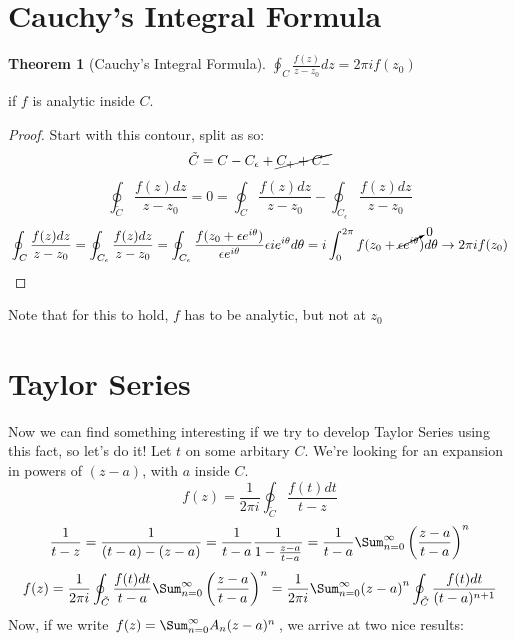 \documentclass[11pt,notitlepage]{article}
\newtheorem{thm}{Theorem}[section]
\begin{document}
\section{Cauchy's Integral Formula}
\begin{thm}[Cauchy's Integral Formula]
$\oint_C \frac{f(z)}{z-z_0} dz = 2\pi i f(z_0)$ 
\end{thm}
\begin{flushright}
if $f$ is analytic inside $C$.
\end{flushright}
\begin{proof}

Start with this contour, split as so:
$$\tilde C = C - C_\epsilon +\cancel{C_{+} + C_{-}}$$
$$\oint_{\tilde C} \frac{f(z) dz}{z-z_0} 
= 0 
=\oint_{ C} \frac{f(z) dz}{z-z_0} -\oint_{C_\epsilon} \frac{f(z) dz}{z-z_0}$$
$$\oint_{C} \frac{f(z) dz}{z-z_0} 
= \oint_{C_\epsilon} \frac{f(z) dz}{z-z_0}
= \oint_{C_\epsilon} \frac{f(z_0 + \epsilon e^{i\theta}) }{\epsilon e^{i\theta}} \epsilon i e^{i\theta} d\theta 
= i \int_0^{2\pi} f(z_0 + \cancelto{0}{\epsilon e^{i\theta}}) d\theta \rightarrow 2\pi i f(z_0) $$
\end{proof}
Note that for this to hold, $f$ has to be analytic, but not at $z_0$
\section{Taylor Series}
Now we can find something interesting if we try to develop Taylor Series using this fact, so let's do it! Let $t$ on some arbitary $C$. We're looking for an expansion in powers of $(z-a)$, with $a$ inside $C$. 
$$ f(z) = \frac1{2\pi i}\oint_{\tilde C} \frac{f(t) dt}{t-z} $$
$$\frac1{t-z} = \frac1{(t-a)-(z-a)} = \frac1{t-a}\frac1{1-{\frac{z-a}{t-a}}} = \frac1{t-a}\Sum_{n=0}^\infty\left(\frac{z-a}{t-a}\right)^n$$
$$ f(z) = \frac1{2\pi i}\oint_{\tilde C} \frac{f(t) dt}{t-a} \Sum_{n=0}^\infty\left(\frac{z-a}{t-a}\right)^n  = \frac1{2\pi i} \Sum_{n=0}^\infty{(z-a)}^n \oint_{\tilde C} \frac{f(t) dt}{(t-a)^{n+1}} $$
Now, if we write $f(z) = \Sum_{n=0}^\infty A_n (z-a)^n$, we arrive at two nice results:
\end{document}

